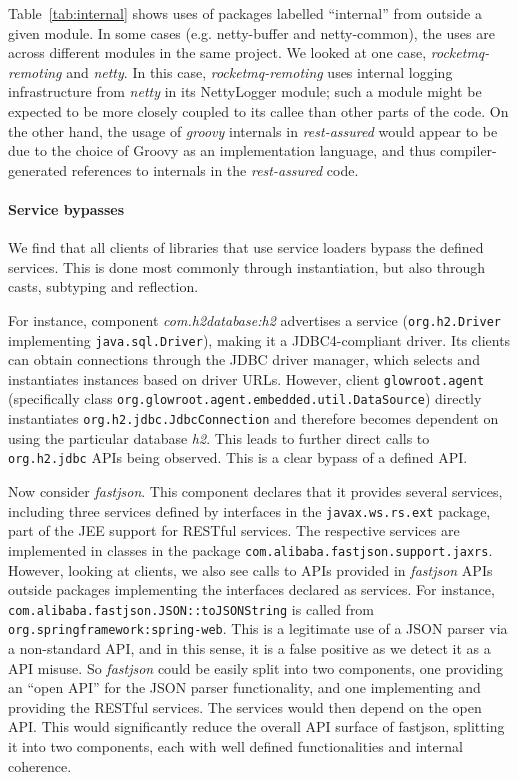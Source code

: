 Table~\ref{tab:internal} shows uses of packages labelled ``internal'' from outside
a given module. In some cases (e.g. netty-buffer and netty-common),
the uses are across different modules in the same project. We looked
at one case, \emph{rocketmq-remoting} and \emph{netty}. In this case,
\emph{rocketmq-remoting} uses internal logging infrastructure from
\emph{netty} in its NettyLogger module; such a module might be
expected to be more closely coupled to its callee than other parts of
the code. On the other hand, the usage of \emph{groovy} internals in
\emph{rest-assured} would appear to be due to the choice of Groovy as
an implementation language, and thus compiler-generated references to
internals in the \emph{rest-assured} code.




\paragraph{Service bypasses}
We find that all clients of libraries that use service loaders bypass the defined services. This is done most commonly through instantiation, but also through casts, subtyping and reflection.

For instance, component \emph{com.h2database:h2} advertises a service (\texttt{org.h2.Driver} implementing \texttt{java.sql.Driver}), making it a JDBC4-compliant driver. Its clients can obtain connections through the JDBC driver manager, which selects and instantiates instances based on driver URLs. However, client \texttt{glowroot.agent} (specifically class \texttt{org.glowroot.\-agent.embedded.util.DataSource}) directly instantiates \texttt{org.h2.jdbc.JdbcConnection} and therefore becomes dependent on using the particular database \emph{h2}. This leads to further direct calls to \texttt{org.h2.jdbc} APIs being observed. This is a clear bypass of a defined API. 

Now consider \emph{fastjson}. This component declares that it provides several services, including three services defined by interfaces in the \texttt{javax.ws.rs.ext} package, part of the JEE support for RESTful services. 
The respective services are implemented in classes in the package \texttt{com.alibaba.fastjson.support.jaxrs}.   
However, looking at clients, we also see calls to APIs provided in \emph{fastjson} APIs outside packages implementing the interfaces declared as services. For instance, \texttt{com.alibaba.fastjson.JSON::toJSONString} is called from \texttt{org.springframework:spring-web}.
This is a legitimate use of a JSON parser via a non-standard API, and in this sense, it is a false positive as we detect it as a API misuse. So \emph{fastjson} could be easily split into two components, one providing an ``open API'' for the JSON parser functionality, and one implementing and providing the RESTful services. The services would then depend on the open API. This would significantly reduce the overall API surface of fastjson, splitting it into two components, each with well defined functionalities and internal coherence.

